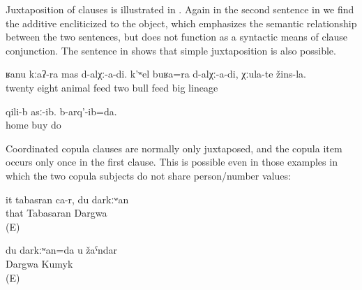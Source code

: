 Juxtaposition of clauses is illustrated in . Again in the second sentence in  we find the additive  encliticized to the object, which emphasizes the semantic relationship between the two sentences, but does not function as a syntactic means of clause conjunction. The sentence in  shows that simple juxtaposition is also possible.
%
\begin{exe}
	\ex	\label{ex:We fed 28 animals, and we also fed two good (lit. big) breeding bulls.}
	\gll	ʁanu	kːaʔ-ra	mas	d-alχː-a-di.	k'ʷel	buʁa=ra d-alχː-a-di,	χːula-te	žins-la.\\
		twenty	eight	animal	feed two	bull	feed	big 	lineage\\
	\glt	{}

	\ex	\label{ex:‎They bought (the medicine) at home and I did (the cure)}
	\gll	qili-b	asː-ib.	b-arq'-ib=da.\\
		home	buy	do\\
	\glt	{} %
\end{exe}

Coordinated copula clauses are normally only juxtaposed, and the copula item occurs only once in the first clause. This is possible even in those examples in which the two copula subjects do not share person/number values:
%
\begin{exe}
	\ex	\label{ex:‎‎She is Tabasaran, I (am) Dargwa}
	\gll	it	tabasran	ca-r,		du	darkːʷan\\
		that	Tabasaran			Dargwa\\
	\glt	{} (E)

	\ex	\label{ex:‎‎I am Dargwa, you (are) Kumyk}
	\gll	du	darkːʷan=da		u	žaˁndar\\
			Dargwa			Kumyk\\
	\glt	{} (E)
\end{exe}

